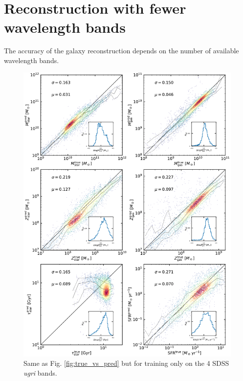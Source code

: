 \documentclass[conference]{IEEEtran}
\begin{document}



%


\appendix
\section{Reconstruction with fewer wavelength bands}
\label{sec:ap_bands}

The accuracy of the galaxy reconstruction depends on the number of available wavelength bands. 

\begin{figure}
\vspace{-.4cm}
\begin{center}
\includegraphics[height=.5\textheight]{./plots/predicted_vs_true_all_masked_log_ugri.pdf}
\end{center}
\vspace{-.5cm}
\caption{Same as Fig. \ref{fig:true_vs_pred} but for training only on the 4 SDSS \textit{ugri} bands.}
\label{fig:true_vs_pred2}
\end{figure}
\end{document}
